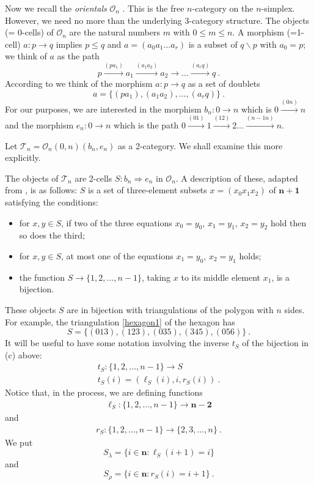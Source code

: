\documentclass[a4paper,12pt,reqno]{amsart}
\theoremstyle{definition}
\theoremstyle{fact}
\theoremstyle{genquest}
\theoremstyle{step}
\newcommand{\lra}{\longrightarrow}
\newcommand{\Lra}{\Longrightarrow}
\def\CO{{\mathscr O}}
\def\CT{{\mathscr T}}
\begin{document}
Now we recall the {\em orientals} $\CO_n$ \cite{aos}. This is the free $n$-category on the $n$-simplex.
However, we need no more than the underlying 3-category structure. 
The objects (= 0-cells) of $\CO_n$ are the natural numbers $m$ with $0 \le m \le n$. 
A morphism (=1-cell) $a : p \lra q$ implies $p\le q$ and $a=(a_0 a_1\dots a_r)$ is a subset of $q\smallsetminus p$
with $a_0 =p$; we think of $a$ as the path 
$$p\stackrel{(pa_1)}\lra a_1\stackrel{(a_1a_2)}\lra a_2\lra \dots \stackrel{(a_rq)}\lra q \ .$$
According to \cite{aos} we think of the morphism $a : p \lra q$ as a set of doublets 
$$a=\{(pa_1), (a_1a_2),\dots , (a_rq)\} \ .$$  
For our purposes, we are interested in the morphism $b_n : 0 \lra n$ which is $0\stackrel{(0n)}\lra n$ and
the morphism $e_n : 0 \lra n$ which is the path $0\stackrel{(01)}\lra 1 \stackrel{(12)}\lra 2 \dots  \stackrel{(n-1n)}\lra n$. 

Let $\CT_n = \CO_n (0,n)(b_n,e_n)$ as a 2-category. We shall examine this more explicitly. 

The objects of $\CT_n$ are 2-cells $S:b_n \Lra e_n$ in $\CO_n$.
A description of these, adapted from \cite{aos}, is as follows: 
$S$ is a set of three-element subsets $x=(x_0x_1x_2)$ of $\mathbf{n+1}$ 
satisfying the conditions:
\begin{itemize}
\item[(a)] for $x,y\in S$, if two of the three equations $x_0=y_0$, $x_1=y_1$, $x_2=y_2$ hold then so does the third;
\item[(b)] for $x,y\in S$, at most one of the equations $x_1=y_0$, $x_2=y_1$ holds;
\item[(c)] the function $S\lra \{1,2,\dots ,n-1\}$, taking $x$ to its middle element $x_1$, is a bijection. 
\end{itemize} 
These objects $S$ are in bijection with triangulations of the polygon with $n$ sides.
For example, the triangulation \eqref{hexagon1} of the hexagon has 
\begin{equation}
S=\{(013),(123),(035),(345),(056)\} \ .
\end{equation} 
It will be useful to have some notation involving the inverse $t_S$ of the bijection in (c) above:
\begin{eqnarray}
t_S : \{1,2,\dots ,n-1\} \lra S \nonumber \\
t_S(i) = (\ell_S(i), i , r_S(i)) \ .
\end{eqnarray}
Notice that, in the process, we are defining functions 
\begin{eqnarray}
\ell_S : \{1,2,\dots ,n-1\} \lra \mathbf{n-2}
\end{eqnarray}
and 
\begin{eqnarray}\label{rightfns}
r_S: \{1,2,\dots ,n-1\} \lra \{2,3,\dots ,n\} \ .
\end{eqnarray}
We put 
\begin{equation}
S_{\lambda} = \{i\in \mathbf{n} : \ell_S(i+1)=i \}
\end{equation}
and
\begin{equation}
S_{\rho} = \{i\in \mathbf{n} : r_S(i)=i+1 \} \ .
\end{equation}
\end{document}
